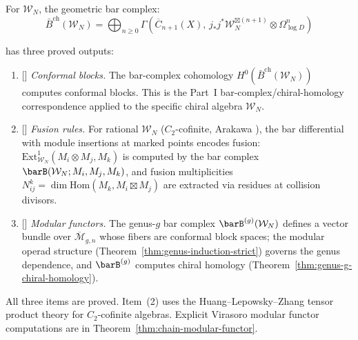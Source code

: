 \begin{theorem}
\label{thm:w-algebra-bar-complex}
For $\mathcal{W}_N$, the geometric bar complex:
\[\bar{B}^{\text{ch}}(\mathcal{W}_N) =
\bigoplus_{n \geq 0} \Gamma\!\left(\overline{C}_{n+1}(X),\,
  j_*j^*\mathcal{W}_N^{\boxtimes(n+1)} \otimes \Omega^n_{\log D}\right)\]

has three proved outputs:
\begin{enumerate}
\item \textup{[\ClaimStatusProvedHere]}
\emph{Conformal blocks.}
The bar-complex cohomology
$H^0(\bar{B}^{\mathrm{ch}}(\mathcal{W}_N))$ computes conformal blocks.
This is the Part~I bar-complex/chiral-homology correspondence applied
to the specific chiral algebra $\mathcal{W}_N$.

\item \textup{[\ClaimStatusProvedHere]}
\emph{Fusion rules.} For rational $\mathcal{W}_N$
\textup{(}$C_2$-cofinite, Arakawa \cite{Ara07}\textup{)},
the bar differential with module insertions at marked
points encodes fusion: $\mathrm{Ext}^1_{\mathcal{W}_N}(M_i
\otimes M_j, M_k)$ is computed by the bar complex
$\barB(\mathcal{W}_N; M_i, M_j, M_k)$, and fusion
multiplicities $N_{ij}^k = \dim
\mathrm{Hom}(M_k, M_i \boxtimes M_j)$ are extracted via
residues at collision divisors.

\item \textup{[\ClaimStatusProvedHere]}
\emph{Modular functors.} The genus-$g$ bar complex
$\barB^{(g)}(\mathcal{W}_N)$ defines a vector bundle
over $\overline{\mathcal{M}}_{g,n}$ whose fibers are
conformal block spaces; the modular operad structure
\textup{(}Theorem~\textup{\ref{thm:genus-induction-strict})}
governs the genus dependence, and
$\barB^{(g)}$ computes chiral homology
\textup{(}Theorem~\textup{\ref{thm:genus-g-chiral-homology})}.
\end{enumerate}
\end{theorem}

\begin{remark}[Scope]
All three items are proved.  Item~(2) uses the Huang--Lepowsky--Zhang tensor product theory \cite{HLZ} for $C_2$-cofinite algebras.  Explicit Virasoro modular functor computations are in Theorem~\ref{thm:chain-modular-functor}.
\end{remark}

